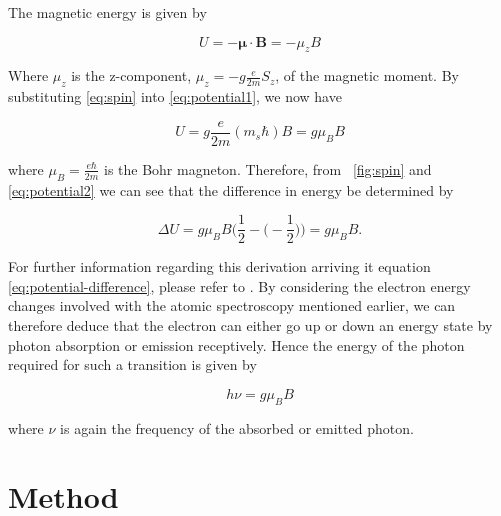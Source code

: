 \documentclass{article}
\newcommand{\figref}[2][\figurename~]{#1\ref{#2}}
\begin{document}
\vspace{2mm}
\noindent
The magnetic energy is given by \cite{Paper02}

\begin{equation}
\label{eq:potential1}
U = -\boldsymbol{\mu} \cdot \textbf{B} = - \mu_zB
\end{equation}

\vspace{2mm}
\noindent
Where $\mu_z$ is the z-component, $\mu_z = -g\frac{e}{2m}S_z$, of the magnetic moment. By substituting \eqref{eq:spin} into \eqref{eq:potential1}, we now have


\begin{equation}
\label{eq:potential2}
U = g\frac{e}{2m}(m_s\hbar)B = g\mu_BB
\end{equation}

\vspace{2mm}
\noindent
where $\mu_B = \frac{e\hbar}{2m}$ is the Bohr magneton. Therefore, from \figref{fig:spin} and \eqref{eq:potential2} we can see that the difference in energy be determined by \cite{Paper02}

\begin{equation}
\label{eq:potential-difference}
\Delta U = g\mu_BB\Big(\frac{1}{2} - \Big(-\frac{1}{2}\Big)\Big) = g\mu_BB.
\end{equation}

\vspace{2mm}
\noindent
For further information regarding this derivation arriving it equation \eqref{eq:potential-difference}, please refer to \cite{Book01}. By considering the electron energy changes involved with the atomic spectroscopy mentioned earlier, we can therefore deduce that the electron can either go up or down an energy state by photon absorption or emission receptively. Hence the energy of the photon required for such a transition is given by

\begin{equation}
\label{eq:frequency-equation}
h\nu = g\mu_BB
\end{equation}

\vspace{2mm}
\noindent
where $\nu$ is again the frequency of the absorbed or emitted photon. 

 
\section{Method}
\label{sec:method}
\end{document}
